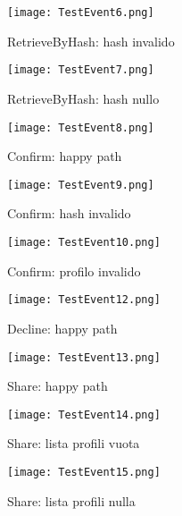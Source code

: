 \begin{figure}[h!]
    \begin{center}
        \texttt{[image: TestEvent6.png]}
        \caption{RetrieveByHash: hash invalido}
    \end{center}
\end{figure}
\begin{figure}[h!]
    \begin{center}
        \texttt{[image: TestEvent7.png]}
        \caption{RetrieveByHash: hash nullo}
    \end{center}
\end{figure}
\begin{figure}[h!]
    \begin{center}
        \texttt{[image: TestEvent8.png]}
        \caption{Confirm: happy path}
    \end{center}
\end{figure}
\begin{figure}[h!]
    \begin{center}
        \texttt{[image: TestEvent9.png]}
        \caption{Confirm: hash invalido}
    \end{center}
\end{figure}\begin{figure}[h!]
    \begin{center}
        \texttt{[image: TestEvent10.png]}
        \caption{Confirm: profilo invalido}
    \end{center}
\end{figure}
\begin{figure}[h!]
    \begin{center}
        \texttt{[image: TestEvent12.png]}
        \caption{Decline: happy path}
    \end{center}
\end{figure}
\begin{figure}[h!]
    \begin{center}
        \texttt{[image: TestEvent13.png]}
        \caption{Share: happy path}
    \end{center}
\end{figure}
\begin{figure}[h!]
    \begin{center}
        \texttt{[image: TestEvent14.png]}
        \caption{Share: lista profili vuota}
    \end{center}
\end{figure}
\begin{figure}[h!]
    \begin{center}
        \texttt{[image: TestEvent15.png]}
        \caption{Share: lista profili nulla}
    \end{center}
\end{figure}

\clearpage